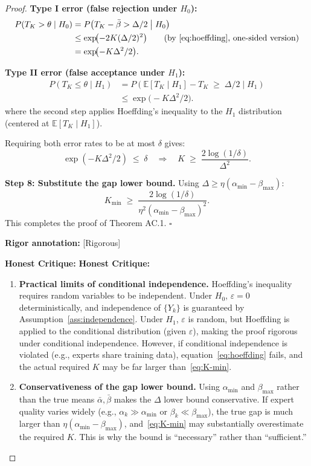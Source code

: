 \documentclass[12pt,a4paper]{article}
\newenvironment{critique}
  {\medskip\noindent\textcolor{red!60!black}{\textbf{Honest Critique:}}\par\smallskip
   \color{red!60!black}\begin{enumerate}[label=\textbullet,leftmargin=*,nosep]}
  {\end{enumerate}\color{black}\medskip}
\newcommand{\rigorous}{\textcolor{green!50!black}{\small\textsf{[Rigorous]}}}
\newcommand{\E}{\mathbb{E}}
\newcommand{\gap}{\Delta}
\begin{document}
\begin{proof}
\textbf{Type I error (false rejection under $H_0$):}
\begin{align*}
    P(T_K > \theta \mid H_0)
    &= P\!\left(T_K - \bar{\beta} > \gap/2 \;\big|\; H_0\right)  \\
    &\leq \exp\!\bigl(-2K(\gap/2)^{2}\bigr) \qquad\text{(by~\eqref{eq:hoeffding}, one-sided version)} \\
    &= \exp\!\bigl(-K\gap^{2}/2\bigr).
\end{align*}

\textbf{Type II error (false acceptance under $H_1$):}
\begin{align*}
    P(T_K \leq \theta \mid H_1)
    &= P\!\left(\E[T_K\mid H_1] - T_K \;\geq\; \gap/2 \;\big|\; H_1\right) \\
    &\leq \exp\!\bigl(-K\gap^{2}/2\bigr).
\end{align*}
where the second step applies Hoeffding's inequality to the $H_1$ distribution (centered at $\E[T_K\mid H_1]$).

Requiring both error rates to be at most $\delta$ gives:
\[
\exp(-K\gap^{2}/2) \;\leq\; \delta
\quad\Longrightarrow\quad
K \;\geq\; \frac{2\log(1/\delta)}{\gap^{2}}.
\]

\textbf{Step 8: Substitute the gap lower bound.}
Using $\gap \geq \eta(\alpha_{\min}-\beta_{\max})$:
\[
K_{\min} \;\geq\; \frac{2\log(1/\delta)}{\eta^{2}(\alpha_{\min}-\beta_{\max})^{2}}.
\]
This completes the proof of Theorem AC.1. \hfill$\square$

\textbf{Rigor annotation:} \rigorous

\bigskip\noindent
\textbf{Honest Critique:}
\begin{critique}
    \item \textbf{Practical limits of conditional independence.} Hoeffding's inequality requires random variables to be independent.
          Under $H_0$, $\varepsilon=0$ deterministically, and independence of $\{Y_k\}$ is guaranteed by
          Assumption~\ref{ass:independence}. Under $H_1$, $\varepsilon$ is random,
          but Hoeffding is applied to the conditional distribution (given $\varepsilon$), making the proof rigorous under conditional independence.
          However, if conditional independence is violated (e.g., experts share training data), equation~\eqref{eq:hoeffding} fails,
          and the actual required $K$ may be far larger than~\eqref{eq:K-min}.

    \item \textbf{Conservativeness of the gap lower bound.} Using $\alpha_{\min}$ and $\beta_{\max}$ rather than
          the true means $\bar{\alpha},\bar{\beta}$ makes the $\gap$ lower bound conservative. If expert quality varies widely
          (e.g., $\alpha_k\gg\alpha_{\min}$ or $\beta_k\ll\beta_{\max}$),
          the true gap is much larger than $\eta(\alpha_{\min}-\beta_{\max})$, and~\eqref{eq:K-min}
          may substantially overestimate the required $K$. This is why the bound is ``necessary'' rather than ``sufficient.''


\end{critique}
\end{proof}
\end{document}
